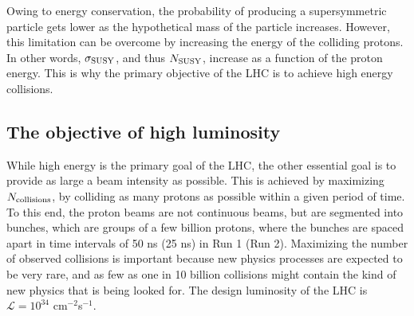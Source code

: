 Owing to energy conservation, the probability of producing a supersymmetric particle gets lower as the hypothetical mass of the particle increases.  However, this limitation can be overcome by increasing the energy of the colliding protons. In other words, $\sigma_{\rm SUSY}$, and thus $N_{\rm SUSY}$, increase as a function of the proton energy. This is why the primary objective of the LHC is to achieve high energy collisions.


\subsection{The objective of high luminosity}
While high energy is the primary goal of the LHC, the other essential goal is to provide as large a beam intensity as possible. This is achieved by maximizing $N_{\rm collisions}$, by colliding as many protons as possible within a given period of time. To this end, the proton beams are not continuous beams, but are segmented into bunches, which are groups of a few billion protons, where the bunches are spaced apart in time intervals of 50 ns (25 ns) in Run 1 (Run 2). Maximizing the number of observed collisions is important because new physics processes are expected to be very rare, and as few as one in 10 billion collisions might contain the kind of new physics that is being looked for. The design luminosity of the LHC is $\mathcal{L}=10^{34}$ cm$^{-2}$s$^{-1}$.

